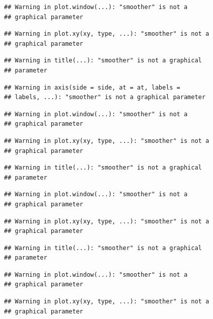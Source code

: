 \documentclass[12pt,]{krantz}
\begin{document}
\begin{verbatim}
## Warning in plot.window(...): "smoother" is not a
## graphical parameter
\end{verbatim}

\begin{verbatim}
## Warning in plot.xy(xy, type, ...): "smoother" is not a
## graphical parameter
\end{verbatim}

\begin{verbatim}
## Warning in title(...): "smoother" is not a graphical
## parameter
\end{verbatim}

\begin{verbatim}
## Warning in axis(side = side, at = at, labels =
## labels, ...): "smoother" is not a graphical parameter
\end{verbatim}

\begin{verbatim}
## Warning in plot.window(...): "smoother" is not a
## graphical parameter
\end{verbatim}

\begin{verbatim}
## Warning in plot.xy(xy, type, ...): "smoother" is not a
## graphical parameter
\end{verbatim}

\begin{verbatim}
## Warning in title(...): "smoother" is not a graphical
## parameter
\end{verbatim}

\begin{verbatim}
## Warning in plot.window(...): "smoother" is not a
## graphical parameter
\end{verbatim}

\begin{verbatim}
## Warning in plot.xy(xy, type, ...): "smoother" is not a
## graphical parameter
\end{verbatim}

\begin{verbatim}
## Warning in title(...): "smoother" is not a graphical
## parameter
\end{verbatim}

\begin{verbatim}
## Warning in plot.window(...): "smoother" is not a
## graphical parameter
\end{verbatim}

\begin{verbatim}
## Warning in plot.xy(xy, type, ...): "smoother" is not a
## graphical parameter
\end{verbatim}
\end{document}
